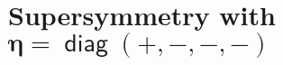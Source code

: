 \documentclass[CheatSheet]{subfiles}
\begin{document}
\summarystyle
\section[Supersymmetry with $\eta=\diag(+,-,-,-)$]{Supersymmetry with $\bm{\eta=\mathop{\mathsf{diag}}(+,-,-,-)}$}


\end{document}

